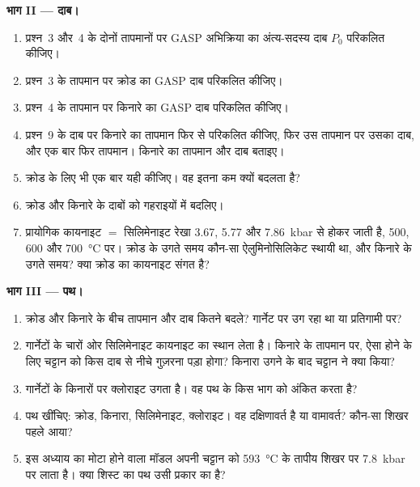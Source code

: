 \begin{problem}
\noindent\textbf{भाग II --- दाब।}
\begin{enumerate}[resume]
\item प्रश्न~3 और~4 के दोनों तापमानों पर GASP अभिक्रिया का अंत्य-सदस्य दाब $P_0$
परिकलित कीजिए।
\item प्रश्न~3 के तापमान पर क्रोड का GASP दाब परिकलित कीजिए।
\item प्रश्न~4 के तापमान पर किनारे का GASP दाब परिकलित कीजिए।
\item प्रश्न~9 के दाब पर किनारे का तापमान फिर से परिकलित कीजिए, फिर उस तापमान पर उसका
दाब, और एक बार फिर तापमान। किनारे का तापमान
और दाब बताइए।
\item क्रोड के लिए भी एक बार यही कीजिए। वह इतना कम क्यों बदलता है?
\item क्रोड और किनारे के दाबों को गहराइयों में बदलिए।
\item प्रायोगिक कायनाइट $=$ सिलिमेनाइट रेखा 3.67, 5.77 और
\qty{7.86}{kbar} से होकर जाती है, 500, 600 और \qty{700}{\celsius} पर। क्रोड के उगते समय कौन-सा ऐलुमिनोसिलिकेट स्थायी था,
और किनारे के उगते समय? क्या क्रोड का कायनाइट संगत है?
\end{enumerate}

\noindent\textbf{भाग III --- पथ।}
\begin{enumerate}[resume]
\item क्रोड और किनारे के बीच तापमान और दाब कितने बदले?
गार्नेट  पर उग रहा था या प्रतिगामी पर?
\item गार्नेटों के चारों ओर सिलिमेनाइट कायनाइट का स्थान लेता है। किनारे के तापमान पर,
ऐसा होने के लिए चट्टान को किस दाब से नीचे गुज़रना पड़ा होगा? किनारा उगने के बाद चट्टान ने
क्या किया?
\item गार्नेटों के किनारों पर क्लोराइट उगता है। वह पथ के किस भाग को अंकित करता है?
\item पथ खींचिए: क्रोड, किनारा, सिलिमेनाइट, क्लोराइट। वह दक्षिणावर्त है या वामावर्त?
कौन-सा शिखर पहले आया?
\item इस अध्याय का मोटा होने वाला मॉडल अपनी चट्टान को \qty{593}{\celsius} के तापीय शिखर पर
\qty{7.8}{kbar} पर लाता है। क्या शिस्ट का पथ उसी प्रकार का है?
\end{enumerate}


\end{problem}
